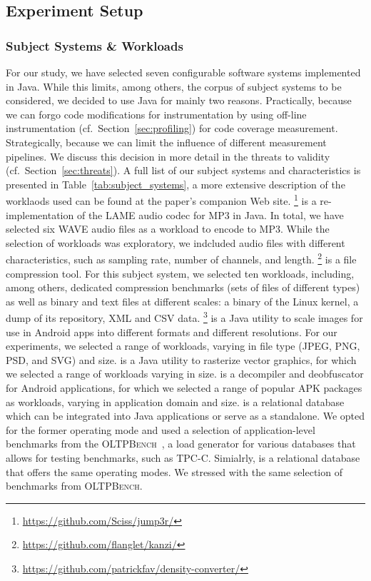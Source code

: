 {
	\color{black}
	\subsection{Experiment Setup}
	\subsubsection{Subject Systems \& Workloads}
	For our study, we have selected seven configurable software systems implemented in Java. While this limits, among others, the corpus of subject systems to be considered, we decided to use Java for mainly two reasons. Practically, because we can forgo code modifications for instrumentation by using off-line instrumentation (cf.~Section~\ref{sec:profiling}) for code coverage measurement. Strategically, because we can limit the influence of different measurement pipelines. We discuss this decision in more detail in the threats to validity (cf.~Section~\ref{sec:threats}). A full list of our subject systems and characteristics is presented in Table~\ref{tab:subject_systems}, a more extensive description of the worklaods used can be found at the paper's companion Web site.
	\jumper\footnote{\url{https://github.com/Sciss/jump3r/}} is a re-implementation of the LAME audio codec for MP3 in Java. In total, we have selected {\color{red}six} WAVE audio files as a workload to encode to MP3. While the selection of workloads was exploratory, we indcluded audio files with different characteristics, such as sampling rate, number of channels, and length. 
	\kanzi\footnote{\url{https://github.com/flanglet/kanzi/}} is a file compression tool. For this subject system, we selected {\color{red}ten} workloads, including, among others, dedicated compression benchmarks (sets of files of different types) as well as binary and text files at different scales: a binary of the Linux kernel, a dump of its repository, XML and CSV data. 
	\dconvert\footnote{\url{https://github.com/patrickfav/density-converter/}} is a Java utility to scale images for use in Android apps into different formats and different resolutions. For our experiments, we selected a range of workloads, varying in file type (JPEG, PNG, PSD, and SVG) and size.
	\batik is a Java utility to rasterize vector graphics, for which we selected a range of workloads varying in size.
	\jadx is a decompiler and deobfuscator for Android applications, for which we selected a range of popular APK packages as workloads, varying in application domain and size.
	\htwo is a relational database which can be integrated into Java applications or serve as a standalone. We opted for the former operating mode and used a selection of application-level benchmarks from the \textsc{OLTPBench}~\cite{difallah_oltp_2013}, a load generator for various databases that allows for testing benchmarks, such as TPC-C. Simialrly, \hsqldb is a relational database that offers the same operating modes. We stressed \hsqldb with the same selection of benchmarks from \textsc{OLTPBench}.
	
}
